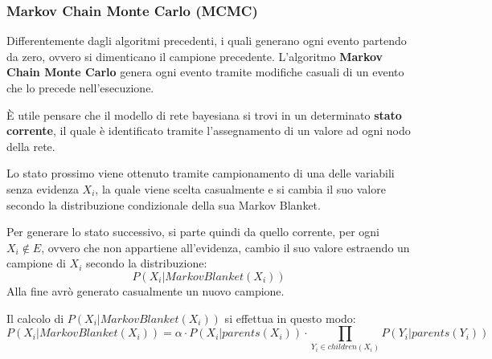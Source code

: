 \subsubsection{Markov Chain Monte Carlo (MCMC)}
Differentemente dagli algoritmi precedenti, i quali generano ogni evento partendo
da zero, ovvero si dimenticano il campione precedente. L'algoritmo \textbf{Markov
    Chain Monte Carlo} genera ogni evento tramite modifiche casuali di un evento
che lo precede nell'esecuzione.

È utile pensare che il modello di rete bayesiana si trovi in un determinato
\textbf{stato corrente}, il quale è identificato tramite l'assegnamento di un
valore ad ogni nodo della rete.

Lo stato prossimo viene ottenuto tramite campionamento di una delle variabili
senza evidenza $X_i$, la quale viene scelta casualmente e si cambia il suo
valore secondo la distribuzione condizionale della sua Markov Blanket.

Per generare lo stato successivo, si parte quindi da quello corrente, per ogni
$X_i \not \in E$, ovvero che non appartiene all'evidenza, cambio il suo valore
estraendo un campione di $X_i$ secondo la distribuzione:
\begin{equation*}
    P(X_i | MarkovBlanket(X_i))
\end{equation*}
Alla fine avrò generato casualmente un nuovo campione.

Il calcolo di $P(X_i | MarkovBlanket(X_i))$ si effettua in questo modo:
\begin{equation}
    P(X_i | MarkovBlanket(X_i)) = \alpha \cdot P(X_i | parents(X_i)) \cdot
    \prod_{Y_i\in children(X_i)} P(Y_i| parents(Y_i))
\end{equation}
